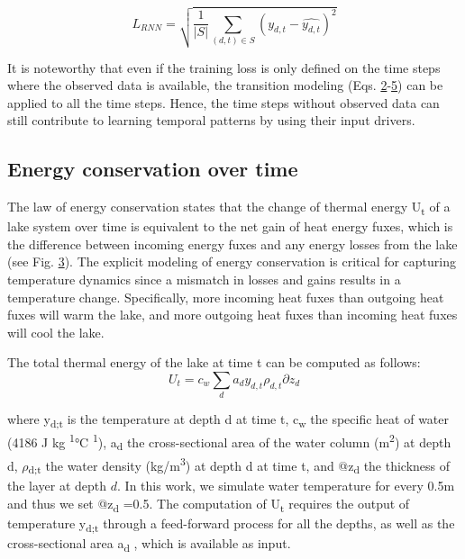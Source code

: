 \documentclass[book.tex]{subfiles}
\begin{document}
\begin{equation}
    L_{RNN}=\sqrt{\frac{1}{|S|}\sum_{(d,t)\in S}(y_{d,t}-\hat{y_{d,t}})^2}
\end{equation}


It is noteworthy that even if the training loss is only defined on
the time steps where the observed data is available, the transition
modeling (Eqs.
\protect\hyperlink{page7}{2}-\protect\hyperlink{page7}{5}) can be
applied to all the time steps. Hence, the time steps without observed
data can still contribute to learning temporal patterns by using their
input drivers.

\subsection{Energy conservation over time}

The law of energy conservation states that the change of thermal energy
U\textsubscript{t} of a lake system over time is equivalent to the net
gain of heat energy fuxes, which is the difference between incoming
energy fuxes and any energy losses from the lake (see Fig.
\protect\hyperlink{page9}{3}). The explicit modeling of energy
conservation is critical for capturing temperature dynamics since a
mismatch in losses and gains results in a temperature change.
Specifically, more incoming heat fuxes than outgoing heat fuxes
will warm the lake, and more outgoing heat fuxes than incoming heat
fuxes will cool the lake.

The total thermal energy of the lake at time t can be computed as
follows:
\begin{equation}
    U_t = c_w \sum_d a_d y_{d,t}\rho_{d,t}\partial z_d
\end{equation}






where y\textsubscript{d;t} is the temperature at depth d at time t,
c\textsubscript{w} the specific heat of water (4186 J kg
\textsuperscript{1}°C \textsuperscript{1}), a\textsubscript{d} the
cross-sectional area of the water column (m\textsuperscript{2}) at depth
d, $\rho$\textsubscript{d;t} the water density (kg/m\textsuperscript{3}) at
depth d at time t, and @z\textsubscript{d} the thickness of the layer at depth $d$.
In this work, we simulate water temperature for every 0.5m and thus we set @z\textsubscript{d} =0.5. 
The computation of U\textsubscript{t} requires the output of temperature
  y\textsubscript{d;t} through a feed-forward process for all the
  depths, as well as the cross-sectional area a\textsubscript{d} , which
  is available as input.
\end{document}
